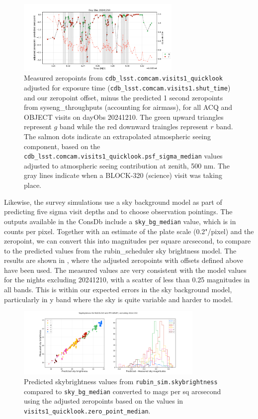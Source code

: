 \begin{figure}
    \centering
    \includegraphics[width=0.7\textwidth]{sp/zeropoints_dayobs_20241210.png}
    \caption{Measured zeropoints from \texttt{cdb\_lsst.comcam.visits1\_quicklook} adjusted for exposure time (\texttt{cdb\_lsst.comcam.visits1.shut\_time}) and our zeropoint offset, minus the predicted 1 second zeropoints from syseng\_throughputs (accounting for airmass), for all ACQ and OBJECT visits on dayObs 20241210. The green upward triangles represent $g$ band while the red downward traingles represent $r$ band. The salmon dots indicate an extrapolated atmospheric seeing component, based on the \texttt{cdb\_lsst.comcam.visits1\_quicklook.psf\_sigma\_median} values adjusted to atmospheric seeing contribution at zenith, 500 nm. The gray lines indicate when a BLOCK-320 (science) visit was taking place. }
    \label{fig:zeropoints_dayobs_20241210}
    \end{figure}


Likewise, the survey simulations use a sky background model as part of predicting five sigma visit depths and to choose observation pointings. The outputs available in the ConsDb include a \texttt{sky\_bg\_median} value, which is in counts per pixel. Together with an estimate of the plate scale (0.2"/pixel) and the zeropoint, we can convert this into magnitudes per square arcsecond, to compare to the predicted values from the rubin\_scheduler sky brightness model. The results are shown in , where the adjusted zeropoints with offsets defined above have been used. The measured values are very consistent with the model values for the nights excluding 20241210, with a scatter of less than 0.25 magnitudes in all bands. This is  within our expected errors in the sky background model, particularly in y band where the sky is quite variable and harder to model.

\begin{figure}
    \centering
    \includegraphics[width=0.8\textwidth]{sp/sky.png}
    \caption{Predicted skybrightness values from \texttt{rubin\_sim.skybrightness} compared to
      \texttt{sky\_bg\_median} converted to mags per sq arcsecond  using the adjusted zeropoints based on the values in  \texttt{visits1\_quicklook.zero\_point\_median}.}
    \label{fig:sky}
    \end{figure}


